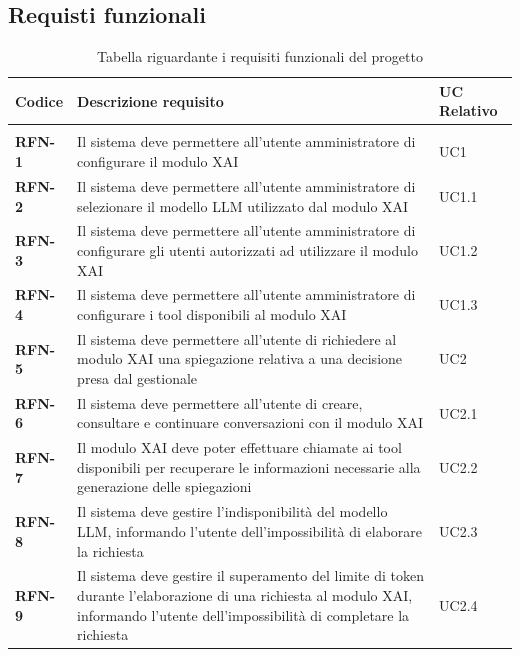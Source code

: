 \subsection{Requisti funzionali}
\keepXColumns
{}
    \begin{longtable}{|l|p{}|l|}
        \hline
        \rowcolor{gold}
        \textbf{Codice} & \textbf{Descrizione requisito} & \textbf{UC Relativo} \\
        \hline
        \endhead

        \hline
        \rowcolor{white}
        \caption{Tabella riguardante i requisiti funzionali del progetto} \label{tab:requisiti_funzionali} \\
        \endlastfoot 

        \textbf{RFN-1} & Il sistema deve permettere all'utente amministratore di configurare il modulo XAI & UC1 \\
        \hline
        \textbf{RFN-2} & Il sistema deve permettere all'utente amministratore di selezionare il modello LLM utilizzato dal modulo XAI & UC1.1  \\
        \hline
        \textbf{RFN-3} & Il sistema deve permettere all'utente amministratore di configurare gli utenti autorizzati ad utilizzare il modulo XAI & UC1.2  \\
        \hline
        \textbf{RFN-4} & Il sistema deve permettere all'utente amministratore di configurare i tool disponibili al modulo XAI & UC1.3  \\
        \hline
        \textbf{RFN-5} & Il sistema deve permettere all'utente di richiedere al modulo XAI una spiegazione relativa a una decisione presa dal gestionale & UC2\\
        \hline
        \textbf{RFN-6} & Il sistema deve permettere all'utente di creare, consultare e continuare conversazioni con il modulo XAI & UC2.1 \\
        \hline
        \textbf{RFN-7} & Il modulo XAI deve poter effettuare chiamate ai tool disponibili per recuperare le informazioni necessarie alla generazione delle spiegazioni & UC2.2 \\
        \hline
        \textbf{RFN-8} & Il sistema deve gestire l'indisponibilità del modello LLM, informando l'utente dell'impossibilità di elaborare la richiesta & UC2.3  \\
        \hline
        \textbf{RFN-9} & Il sistema deve gestire il superamento del limite di token durante l'elaborazione di una richiesta al modulo XAI, informando l'utente dell'impossibilità di completare la richiesta & UC2.4 \\

\end{longtable}
